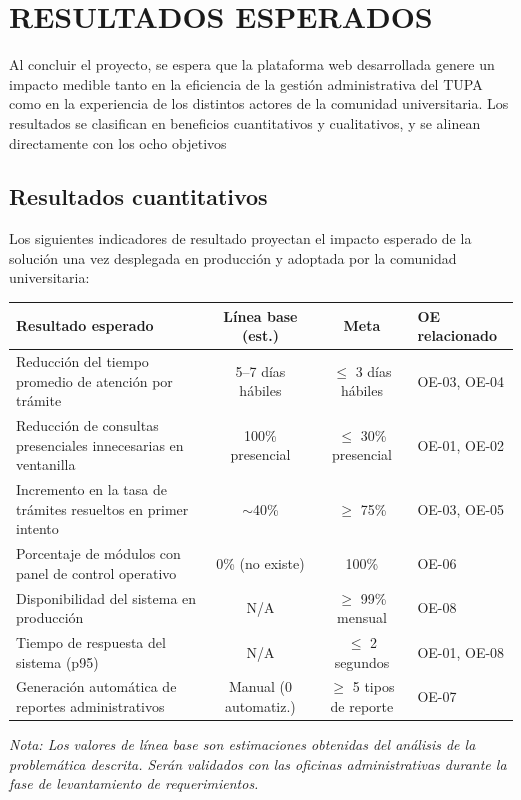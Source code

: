 \newpage
\chapter{RESULTADOS ESPERADOS}

Al concluir el proyecto, se espera que la plataforma web desarrollada genere un impacto
medible tanto en la eficiencia de la gestión administrativa del TUPA como en la experiencia
de los distintos actores de la comunidad universitaria. Los resultados se clasifican en
beneficios cuantitativos y cualitativos, y se alinean directamente con los ocho objetivos

\section{Resultados cuantitativos}
Los siguientes indicadores de resultado proyectan el impacto esperado de la solución una vez
desplegada en producción y adoptada por la comunidad universitaria:

{\small
\begin{tabular}{|p{3.9cm}|c|c|p{2.6cm}|}
\hline
\textbf{Resultado esperado} & \textbf{Línea base (est.)} & \textbf{Meta} & \textbf{OE relacionado} \\
\hline
Reducción del tiempo promedio de atención por trámite & 5–7 días hábiles & $\leq$ 3 días hábiles & OE-03, OE-04 \\
\hline
Reducción de consultas presenciales innecesarias en ventanilla & 100\% presencial & $\leq$ 30\% presencial & OE-01, OE-02 \\
\hline
Incremento en la tasa de trámites resueltos en primer intento & $\sim$40\% & $\geq$ 75\% & OE-03, OE-05 \\
\hline
Porcentaje de módulos con panel de control operativo & 0\% (no existe) & 100\% & OE-06 \\
\hline
Disponibilidad del sistema en producción & N/A & $\geq$ 99\% mensual & OE-08 \\
\hline
Tiempo de respuesta del sistema (p95) & N/A & $\leq$ 2 segundos & OE-01, OE-08 \\
\hline
Generación automática de reportes administrativos & Manual (0 automatiz.) & $\geq$ 5 tipos de reporte & OE-07 \\
\hline
\end{tabular}
}

\textit{Nota: Los valores de línea base son estimaciones obtenidas del análisis de la
problemática descrita. Serán validados con las oficinas administrativas
durante la fase de levantamiento de requerimientos.}

